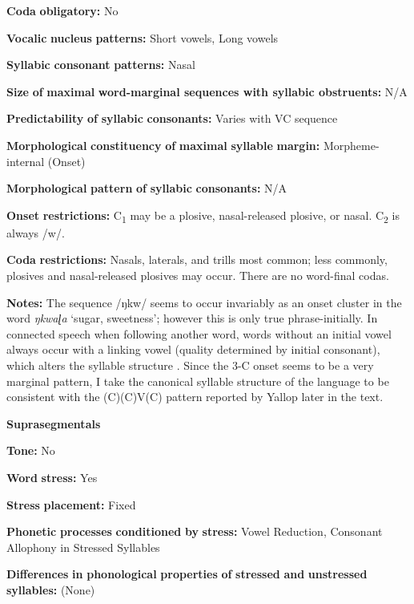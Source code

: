 \begin{styleBody}
\textbf{Coda} \textbf{obligatory:} No

\textbf{Vocalic} \textbf{nucleus} \textbf{patterns:} Short vowels, Long vowels

\textbf{Syllabic} \textbf{consonant} \textbf{patterns:} Nasal

\textbf{Size} \textbf{of} \textbf{maximal} \textbf{word{}-marginal sequences with syllabic obstruents:} N/A

\textbf{Predictability} \textbf{of} \textbf{syllabic} \textbf{consonants:} Varies with VC sequence

\textbf{Morphological} \textbf{constituency} \textbf{of} \textbf{maximal} \textbf{syllable} \textbf{margin:} Morpheme-internal (Onset)

\textbf{Morphological} \textbf{pattern} \textbf{of} \textbf{syllabic} \textbf{consonants:} N/A

\textbf{Onset} \textbf{restrictions:} C\textsubscript{1} may be a plosive, nasal-released plosive, or nasal. C\textsubscript{2} is always /w/.

\textbf{Coda} \textbf{restrictions:} Nasals, laterals, and trills most common; less commonly, plosives and nasal-released plosives may occur. There are no word-final codas.

\textbf{Notes:} The sequence /ŋkw/ seems to occur invariably as an onset cluster in the word \textit{ŋkwaɭa} ‘sugar, sweetness’; however this is only true phrase-initially. In connected speech when following another word, words without an initial vowel always occur with a linking vowel (quality determined by initial consonant), which alters the syllable structure \citep[28-30]{Yallop1977}. Since the 3-C onset seems to be a very marginal pattern, I take the canonical syllable structure of the language to be consistent with the (C)(C)V(C) pattern reported by Yallop later in the text.

\textbf{Suprasegmentals}

\textbf{Tone:} No

\textbf{Word} \textbf{stress:} Yes

\textbf{Stress} \textbf{placement:} Fixed

\textbf{Phonetic} \textbf{processes} \textbf{conditioned} \textbf{by} \textbf{stress:} Vowel Reduction, Consonant Allophony in Stressed Syllables

\textbf{Differences} \textbf{in} \textbf{phonological} \textbf{properties} \textbf{of} \textbf{stressed} \textbf{and} \textbf{unstressed} \textbf{syllables:} (None)


\end{styleBody}
